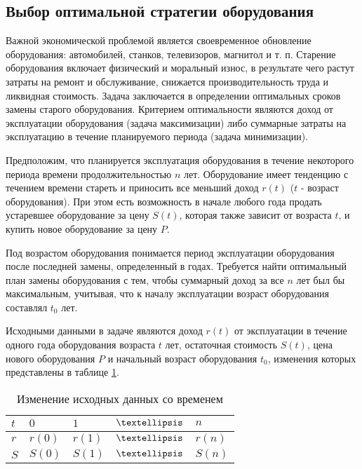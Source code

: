 \subsection{Выбор оптимальной стратегии оборудования}

Важной экономической проблемой является своевременное обновление оборудования: автомобилей, станков, телевизоров, магнитол и т. п. Старение оборудования включает физический и моральный износ, в результате чего растут затраты на ремонт и обслуживание, снижается производительность труда и ликвидная стоимость. Задача заключается в определении оптимальных сроков замены старого оборудования. Критерием оптимальности являются доход от эксплуатации оборудования (задача максимизации) либо суммарные затраты на эксплуатацию в течение планируемого периода (задача минимизации).

Предположим, что планируется эксплуатация оборудования в течение некоторого периода времени продолжительностью $n$ лет. Оборудование имеет тенденцию с течением времени стареть и приносить все меньший доход $r(t)$ ($t$ - возраст оборудования). При этом есть возможность в начале любого года продать устаревшее оборудование за цену $S(t)$, которая также зависит от возраста $t$, и купить новое оборудование за цену $P$.

Под возрастом оборудования понимается период эксплуатации оборудования после последней замены, определенный в годах. Требуется найти оптимальный план замены оборудования с тем, чтобы суммарный доход за все $n$ лет был бы максимальным, учитывая, что к началу эксплуатации возраст оборудования составлял $t_0$ лет.

Исходными данными в задаче являются доход $r(t)$ от эксплуатации в течение одного года оборудования возраста $t$ лет, остаточная стоимость $S(t)$, цена нового оборудования $P$ и начальный возраст оборудования $t_0$, изменения которых представлены в таблице \ref{table:hardware:arguments:change}.


\begin{table}[!ht]
	\caption{Изменение исходных данных со временем}
	\label{table:hardware:arguments:change}
  \centering
  \begin{tabularx}{\linewidth}{ |X|X|X|X|X| }
	\hline
	$t$ & $0$ & $1$ & $ \textellipsis $ & $n$\\
	\hline
	$r$ & $r(0)$ & $r(1)$ & $ \textellipsis $ & $r(n)$\\
	\hline
	$S$ & $S(0)$ & $S(1)$ & $ \textellipsis $ & $S(n)$\\
	\hline
  \end{tabularx}
\end{table}

